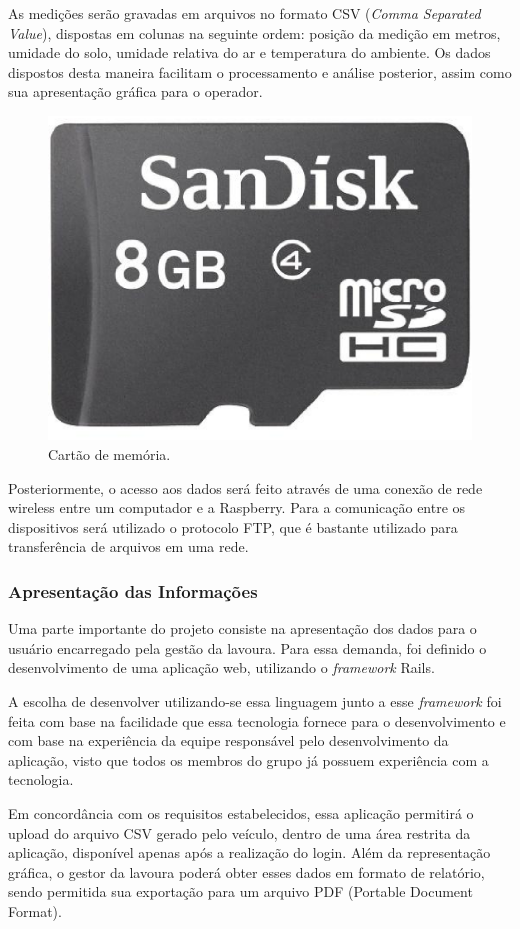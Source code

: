   As medições serão gravadas em arquivos no formato CSV (\textit{Comma Separated Value}),
  dispostas em colunas na seguinte ordem: posição da medição
  em metros, umidade do solo, umidade relativa do ar e temperatura do
  ambiente.
  Os dados dispostos desta maneira facilitam o processamento e
  análise posterior, assim como sua apresentação gráfica para
  o operador.

  \begin{figure}[!htbp]
  \begin{center}
  \includegraphics[width=.3\textwidth]{figuras/sdcard.eps}
  \caption{\label{fig:sdcard}Cartão de memória.}
  \end{center}
  \end{figure}

  Posteriormente, o acesso aos dados será feito através de uma conexão de  rede
  wireless entre um computador e a Raspberry. Para a comunicação  entre os
  dispositivos será utilizado o protocolo FTP, que é bastante utilizado para
  transferência de arquivos em uma rede.

  \subsubsection{Apresentação das Informações}

  Uma parte importante do projeto consiste na apresentação dos
  dados para o usuário encarregado pela gestão da lavoura. Para essa demanda,
  foi definido o desenvolvimento de uma aplicação web, utilizando
  o \textit{framework} Rails.

  A escolha de desenvolver utilizando-se essa linguagem junto a
  esse \textit{framework} foi feita com base na facilidade que essa
  tecnologia fornece para o desenvolvimento e com base na experiência
  da equipe responsável pelo desenvolvimento da aplicação, visto que
  todos os membros do grupo já possuem experiência com a tecnologia.

  Em concordância com os requisitos estabelecidos, essa aplicação
  permitirá o upload do arquivo CSV gerado pelo veículo, dentro de
  uma área restrita da aplicação, disponível apenas após a realização
  do login.
  Além da representação gráfica, o gestor da lavoura poderá obter
  esses dados em formato de relatório, sendo permitida sua
  exportação para um arquivo PDF (Portable Document Format).


